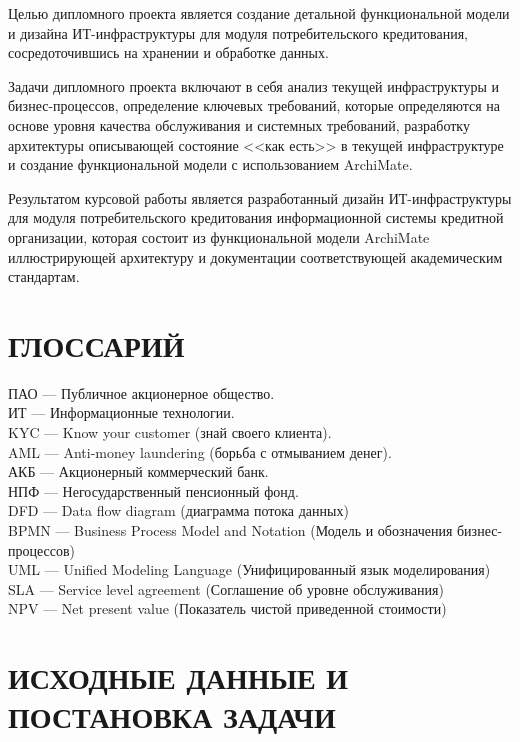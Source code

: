 \documentclass[14pt, a4paper]{extarticle}
\begin{document}
Целью дипломного проекта является создание детальной функциональной модели и
дизайна ИТ-инфраструктуры для модуля потребительского кредитования,
сосредоточившись на хранении и обработке данных.

Задачи дипломного проекта включают в себя анализ текущей инфраструктуры и
бизнес-процессов, определение ключевых требований, которые определяются на
основе уровня качества обслуживания и системных требований, разработку
архитектуры описывающей состояние <<как есть>> в текущей инфраструктуре и
создание функциональной модели с использованием ArchiMate.

Результатом курсовой работы является разработанный дизайн ИТ-инфраструктуры для
модуля потребительского кредитования информационной системы кредитной
организации, которая состоит из функциональной модели ArchiMate иллюстрирующей
архитектуру и документации соответствующей академическим стандартам.

\section*{ГЛОССАРИЙ}
{}
\begin{raggedright}
	ПАО --- Публичное акционерное общество. \\
	ИТ --- Информационные технологии. \\
	KYC --- Know your customer (знай своего клиента). \\
	AML --- Anti-money laundering (борьба с отмыванием денег). \\
	АКБ --- Акционерный коммерческий банк. \\
	НПФ --- Негосударственный пенсионный фонд. \\
	DFD --- Data flow diagram (диаграмма потока данных) \\
	BPMN --- Business Process Model and Notation (Модель и обозначения
бизнес-процессов) \\
	UML --- Unified Modeling Language (Унифицированный язык моделирования) \\
	SLA --- Service level agreement (Соглашение об уровне обслуживания) \\
	NPV --- Net present value (Показатель чистой приведенной стоимости) \\
\end{raggedright}

\section{ИСХОДНЫЕ ДАННЫЕ И ПОСТАНОВКА ЗАДАЧИ}
\end{document}
